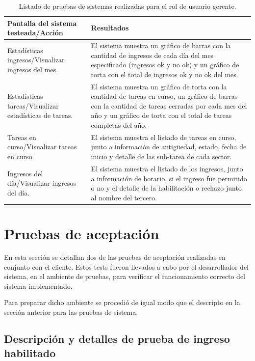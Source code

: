 \begin{table}[h]
	\centering
	\caption[Tipos de pruebas sistema]{Listado de pruebas de sistemas realizadas para el rol de usuario gerente.}
	\begin{tabular}{ p{4cm} p{8.5cm}} 	

		\toprule
		\textbf{Pantalla del sistema testeada/Acción} & 
		\textbf{Resultados} 
		\\
		\midrule
Estadísticas ingresos/Visualizar ingresos del mes.  & El sistema muestra un gráfico de barras con la cantidad de ingresos de cada día del mes especificado (ingresos ok y no ok) y un gráfico de torta con el total de ingresos ok y no ok del mes.  \\
Estadísticas tareas/Visualizar estadísticas de tareas.  & El sistema muestra un gráfico de torta con la cantidad de tareas en curso, un gráfico de barras con la cantidad de tareas cerradas por cada mes del año y un gráfico de torta con el total de tareas completas del año.  \\
Tareas en curso/Visualizar tareas en curso.
  & El sistema muestra el listado de tareas en curso, junto a información de antigüedad, estado, fecha de inicio y detalle de las sub-tarea de cada sector.  \\
Ingresos del día/Visualizar ingresos del día.  & El sistema muestra el listado de los ingresos, junto a información de horario, si el ingreso fue permitido o no y el detalle de la habilitación o rechazo junto al nombre del tercero.  \\

		\bottomrule
		\hline
	\end{tabular}
	\label{tab:tablaTestsSistemaUsuGerente}
\end{table}


\pagebreak
\section{Pruebas de aceptación}\label{sec:PruebasAceptacion}

En esta sección se detallan dos de las pruebas de aceptación realizadas en conjunto con el cliente. Estos tests fueron llevados a cabo por el desarrollador del sistema, en el ambiente de pruebas, para verificar el funcionamiento correcto del sistema implementado.

Para preparar dicho ambiente se procedió de igual modo que el descripto en la sección anterior para las pruebas de sistema.

\subsection{Descripción y detalles de prueba de ingreso habilitado}

